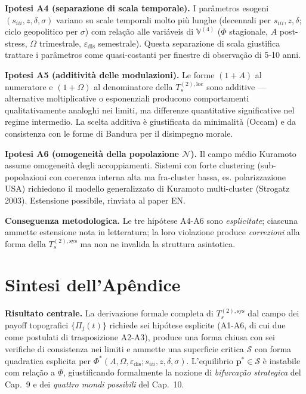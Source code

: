 \Conj{} \textbf{Ipotesi A4 (separazione di scala temporale).} I
parâmetros esogeni \((s_{iii}, z, \delta, \sigma)\) variano su scale
temporali molto più lunghe (decennali per \(s_{iii}, z, \delta\); ciclo
geopolitico per \(\sigma\)) com relação alle variáveis di
\(\mathbb{V}^{(4)}\) (\(\Phi\) stagionale, \(A\) post-stress, \(\Omega\)
trimestrale, \(\varepsilon_{\text{dis}}\) semestrale). Questa
separazione di scala giustifica trattare i parâmetros come quasi-costanti
per finestre di observação di 5-10 anni.

\Conj{} \textbf{Ipotesi A5 (additività delle modulazioni).} Le forme
\((1+A)\) al numeratore e \((1+\Omega)\) al denominatore della
\(T_s^{(2),\text{loc}}\) sono additive --- alternative moltiplicative o
esponenziali producono comportamenti qualitativamente analoghi nei
limiti, ma differenze quantitative significative nel regime intermedio.
La scelta additiva è giustificata da minimalità (Occam) e da consistenza
con le forme di Bandura per il disimpegno morale.

\Conj{} \textbf{Ipotesi A6 (omogeneità della popolazione
\(\mathcal{N}\)).} Il campo médio Kuramoto assume omogeneità degli
accoppiamenti. Sistemi con forte clustering (sub-popolazioni con
coerenza interna alta ma fra-cluster bassa, es. polarizzazione USA)
richiedono il modello generalizzato di Kuramoto multi-cluster (Strogatz
2003). Estensione possibile, rinviata al paper EN.

\Proved{} \textbf{Conseguenza metodologica.} Le tre hipótese A4-A6 sono
\emph{esplicitate}; ciascuna ammette estensione nota in letteratura; la
loro violazione produce \emph{correzioni} alla forma della
\(T_s^{(2),\text{sys}}\) ma non ne invalida la struttura asintotica.



\section{Sintesi dell'Apêndice}\label{sintesi-dellapêndice}

\Proved{} \textbf{Risultato centrale.} La derivazione formale completa
di \(T_s^{(2),\text{sys}}\) dal campo dei payoff topografici
\(\{\Pi_j(t)\}\) richiede sei hipótese esplicite (A1-A6, di cui due come
postulati di trasposizione A2-A3), produce una forma chiusa con sei
verifiche di consistenza nei limiti e ammette una superficie critica
\(\mathcal{S}\) con forma quadratica esplicita per
\(\Phi^*(A, \Omega, \varepsilon_{\text{dis}}; s_{iii}, z, \delta, \sigma)\).
L'equilibrio \(\boldsymbol{p}^* \in \mathcal{S}\) è instabile com relação a
\(\Phi\), giustificando formalmente la nozione di \emph{bifurcação
strategica} del Cap.~9 e dei \emph{quattro mondi possibili} del Cap.~10.

